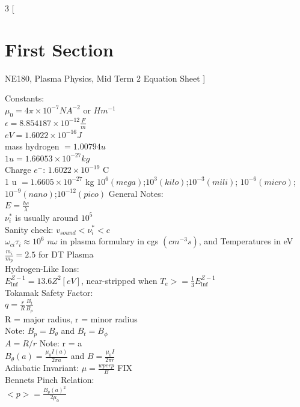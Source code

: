 \documentclass[10pt]{extarticle}
\begin{document}
\begin{multicols}{3}
[
\section{First Section}
NE180, Plasma Physics, Mid Term 2 Equation Sheet
]

Constants:\\
$\mu_{0} = 4 \pi \times 10 ^{-7} NA^{-2}$ or $Hm^{-1} $\\
$\epsilon = 8.854187 \times 10 ^{-12} \frac{F}{m}$\\	
$eV = 1.6022\times 10 ^{-16} J$\\
mass hydrogen $ = 1.00794u  $\\
$1u = 1.66053 \times 10^{-27} kg $\\
Charge $e^{-}$: $1.6022 \times 10^{-19}$ C\\
1 u $= 1.6605 \times 10^{-27}$ kg
$10^{6}(mega)$;$10^{3}(kilo)$;$10^{-3}(mili)$;
$10^{-6}(micro)$;$10^{-9}(nano)$;$10^{-12}(pico)$
General Notes:\\
$E = \frac{hc}{\lambda}$\\
$\nu_{i}^{*}$ is usually around $10^{5}$\\
Sanity check: $v_{sound}<\nu_{i}^{*}<c$\\
$\omega_{ci}\tau_{i} \approx 10^{6}$
$n\omega$ in plasma formulary in cgs $(cm^{-3}s)$, and Temperatures in eV\\
$\frac{m_{i}}{m_{p}} = 2.5$ for DT Plasma\\

Hydrogen-Like Ions:\\
$E_{\inf}^{Z-1} = 13.6Z^2[eV]$, near-stripped when $T_{e} >= \frac{1}{3}E_{\inf}^{Z-1}$\\

Tokamak Safety Factor:\\
$q = \frac{r}{R}\frac{B_{t}}{B_{p}}$\\
R =  major radius, r = minor radius\\
Note: $B_{p} = B_{\theta}$ and $B_{t} = B_{\phi}$\\
$A = R / r$ Note: r = a\\
$B_{\theta}(a) = \frac{\mu_{0}I(a)}{2 \pi a}$ and $B = \frac{\mu_{0}I}{2\pi r}$\\
Adiabatic Invariant: $\mu = \frac{wperp}{B}$ FIX\\

Bennets Pinch Relation: \\
$<p> = \frac{B_{\theta}(a)^{2}}{2\mu_{0}}$\\


\end{multicols}
\end{document}
